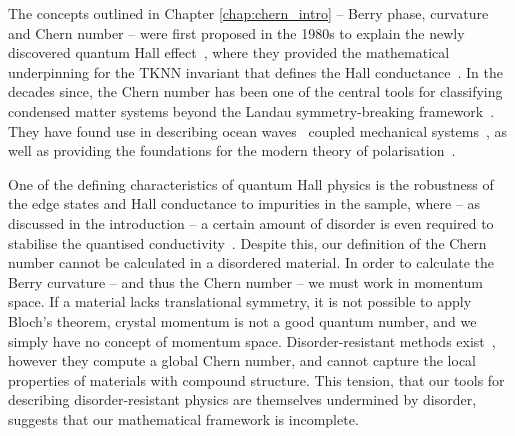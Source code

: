 
The concepts outlined in Chapter \ref{chap:chern_intro} -- Berry phase, curvature and Chern number -- were first proposed in the 1980s to explain the newly discovered quantum Hall effect~\cite{klitzing_new_1980, laughlin_quantized_1981}, where they provided the mathematical underpinning for the TKNN invariant that defines the Hall conductance~\cite{thouless_quantized_1982,berry_quantal_1984}. In the decades since, the Chern number has been one of the central tools for classifying condensed matter systems beyond the Landau symmetry-breaking framework~\cite{haldane_model_1988, hasan_colloquium_2010,qi_topological_2011,chiu_classification_2016}. They have found use in describing ocean waves~\cite{delplace_topological_2017} coupled mechanical systems~\cite{nash_topological_2015,xiao_geometric_2015, mitchell_amorphous_2018}, as well as providing the foundations for the modern theory of polarisation~\cite{resta_macroscopic_1999,vanderbilt_electric_1993, vanderbilt_berry_2018}. 

One of the defining characteristics of quantum Hall physics is the robustness of the edge states and Hall conductance to impurities in the sample, where -- as discussed in the introduction -- a certain amount of disorder is even required to stabilise the quantised conductivity~\cite{trugman_localization_1983,chalker_percolation_1988}. Despite this, our definition of the Chern number cannot be calculated in a disordered material. In order to calculate the Berry curvature -- and thus the Chern number -- we must work in momentum space. If a material lacks translational symmetry, it is not possible to apply Bloch's theorem, crystal momentum is not a good quantum number, and we simply have no concept of momentum space. Disorder-resistant methods exist~\cite{niu_quantized_1985, bellissard_noncommutative_1994}, however they compute a global Chern number, and cannot capture the local properties of materials with compound structure. This tension, that our tools for describing disorder-resistant physics are themselves undermined by disorder, suggests that our mathematical framework is incomplete. 
 
